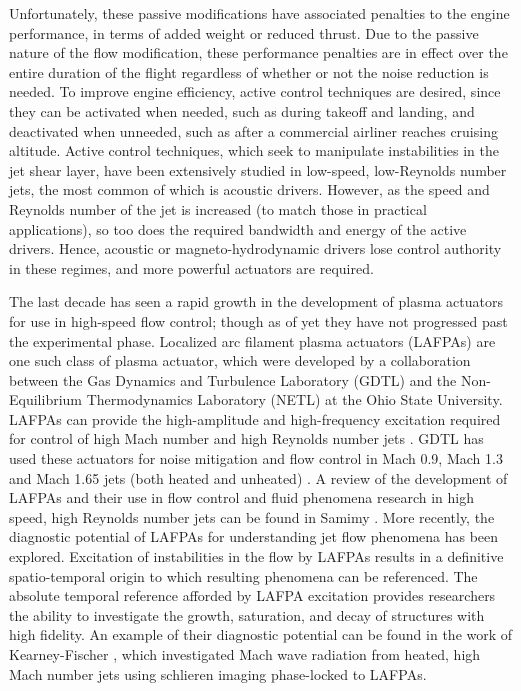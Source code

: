 Unfortunately, these passive modifications have associated penalties to the engine performance, in terms of added weight or reduced thrust.
Due to the passive nature of the flow modification, these performance penalties are in effect over the entire duration of the flight regardless of whether or not the noise reduction is needed. 
To improve engine efficiency, active control techniques are desired, since they can be activated when needed, such as during takeoff and landing, and deactivated when unneeded, such as after a commercial airliner reaches cruising altitude. 
Active control techniques, which seek to manipulate instabilities in the jet shear layer, have been extensively studied in low-speed, low-Reynolds number jets, the most common of which is acoustic drivers. 
However, as the speed and Reynolds number of the jet is increased (to match those in practical applications), so too does the required bandwidth and energy of the active drivers. 
Hence, acoustic or magneto-hydrodynamic drivers lose control authority in these regimes, and more powerful actuators are required.

The last decade has seen a rapid growth in the development of plasma actuators for use in high-speed flow control; though as of yet they have not progressed past the experimental phase.
Localized arc filament plasma actuators (LAFPAs) are one such class of plasma actuator, which were developed by a collaboration between the Gas Dynamics and Turbulence Laboratory (GDTL) and the Non-Equilibrium Thermodynamics Laboratory (NETL) at the Ohio State University.
LAFPAs can provide the high-amplitude and high-frequency excitation required for control of high Mach number and high Reynolds number jets \citep{Utkin2007}. 
GDTL has used these actuators for noise mitigation and flow control in Mach 0.9, Mach 1.3 and Mach 1.65 jets (both heated and unheated) \citep{Samimy2007,Samimy2007a,Samimy2010,Kim2011,Kim2009,Kearney-Fischer2009}. 
A review of the development of LAFPAs and their use in flow control and fluid phenomena research in high speed, high Reynolds number jets can be found in Samimy \etal \citep{Samimy2012}. 
More recently, the diagnostic potential of LAFPAs for understanding jet flow phenomena has been explored. 
Excitation of instabilities in the flow by LAFPAs results in a definitive spatio-temporal origin to which resulting phenomena can be referenced. 
The absolute temporal reference afforded by LAFPA excitation provides researchers the ability to investigate the growth, saturation, and decay of structures with high fidelity. 
An example of their diagnostic potential can be found in the work of Kearney-Fischer \etal \citep{Kearney-Fischer2011a}, which investigated Mach wave radiation from heated, high Mach number jets using schlieren imaging phase-locked to LAFPAs. 

